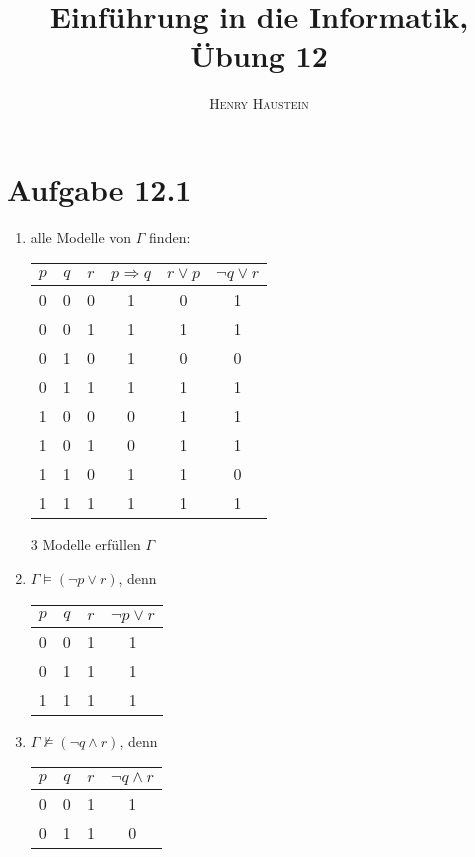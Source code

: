 \documentclass{article}
\title{\textbf{Einführung in die Informatik, Übung 12}}
\author{\textsc{Henry Haustein}}
\date{}
\begin{document}
	\maketitle
	
	\section*{Aufgabe 12.1}
	
	\begin{enumerate}[label=(\alph*)]
		\item alle Modelle von $\Gamma$ finden:
		\begin{center}
			\begin{tabular}{ccc||c|c|c}
				$p$ & $q$ & $r$ & $p\Rightarrow q$ & $r\lor p$ & $\neg q\lor r$ \\
				\hline
				0 & 0 & 0 & 1 & 0 & 1 \\
				\rowcolor{lime}0 & 0 & 1 & 1 & 1 & 1 \\
				0 & 1 & 0 & 1 & 0 & 0 \\
				\rowcolor{lime}0 & 1 & 1 & 1 & 1 & 1 \\
				1 & 0 & 0 & 0 & 1 & 1 \\
				1 & 0 & 1 & 0 & 1 & 1 \\
				1 & 1 & 0 & 1 & 1 & 0 \\
				\rowcolor{lime}1 & 1 & 1 & 1 & 1 & 1 \\
			\end{tabular}
		\end{center}
		3 Modelle erfüllen $\Gamma$
		\item $\Gamma\models (\neg p\lor r)$, denn
		\begin{center}
			\begin{tabular}{ccc||c}
				$p$ & $q$ & $r$ & $\neg p\lor r$ \\
				\hline
				0 & 0 & 1 & 1 \\
				0 & 1 & 1 & 1 \\
				1 & 1 & 1 & 1 \\
			\end{tabular}
		\end{center}
		\item $\Gamma\not\models (\neg q\land r)$, denn
		\begin{center}
			\begin{tabular}{ccc||c}
				$p$ & $q$ & $r$ & $\neg q\land r$ \\
				\hline
				0 & 0 & 1 & 1 \\
				0 & 1 & 1 & 0 \\

\end{tabular}
\end{center}
\end{enumerate}
\end{document}
